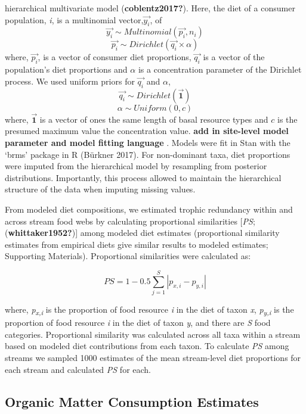 \documentclass[
]{article}
\begin{document}
hierarchical multivariate model (\textbf{coblentz2017?}). Here, the diet
of a consumer population, \emph{i}, is a multinomial
vector,\(\overrightarrow{y_i}\), of
\[\overrightarrow{y_i} \sim Multinomial(\overrightarrow{p_i}, n_i)\]
\[\overrightarrow{p_i} \sim Dirichlet(\overrightarrow{q_i} \times  \alpha) \]
where, \(\overrightarrow{p_i}\), is a vector of consumer diet
proportions, \(\overrightarrow{q_i}\) is a vector of the population's
diet proportions and \(\alpha\) is a concentration parameter of the
Dirichlet process. We used uniform priors for \(\overrightarrow{q_i}\)
and \(\alpha\),
\[\overrightarrow{q_i} \sim Dirichlet(\overrightarrow{\textbf{1}})\]
\[\alpha \sim Uniform(0,\textit{c})\] where,
\(\overrightarrow{\textbf{1}}\) is a vector of ones the same length of
basal resource types and \(\textit{c}\) is the presumed maximum value
the concentration value. \textbf{add in site-level model parameter and
model fitting language} . Models were fit in Stan with the `brms'
package in R (Bürkner 2017). For non-dominant taxa, diet proportions
were imputed from the hierarchical model by resampling from posterior
distributions. Importantly, this process allowed to maintain the
hierarchical structure of the data when imputing missing values.

From modeled diet compositions, we estimated trophic redundancy within
and across stream food webs by calculating proportional similarities
{[}\emph{PS}; (\textbf{whittaker1952?}){]} among modeled diet estimates
(proportional similarity estimates from empirical diets give similar
results to modeled estimates; Supporting Materials). Proportional
similarities were calculated as:

\[ PS = 1 - 0.5 \sum_{j=1}^S|p_{x,i} - p_{y,i}|\]

where, \emph{p\textsubscript{x,i}} is the proportion of food resource
\emph{i} in the diet of taxon \emph{x}, \emph{p\textsubscript{y,i}} is
the proportion of food resource \emph{i} in the diet of taxon \emph{y},
and there are \emph{S} food categories. Proportional similarity was
calculated across all taxa within a stream based on modeled diet
contributions from each taxon. To calculate \emph{PS} among streams we
sampled 1000 estimates of the mean stream-level diet proportions for
each stream and calculated \emph{PS} for each.

\hypertarget{organic-matter-consumption-estimates}{%
\subsection{Organic Matter Consumption
Estimates}\label{organic-matter-consumption-estimates}}
\end{document}
